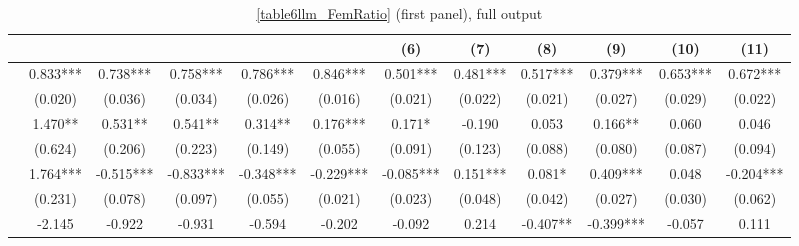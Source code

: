 \begin{table}
    \footnotesize
    \centering
    \begin{threeparttable}
        \caption{\autoref{table6llm_FemRatio} (first panel), full output}
        \label{table6llm_full}
        \begin{tabular}{p{3cm}S@{}S@{}S@{}S@{}S@{}S@{}S@{}S@{}S@{}S@{}S@{}}
            \toprule
            &{}&{}&{}&{}&{}&{(6)}&{(7)}&{(8)}&{(9)}&{(10)}&{(11)}\\
            \midrule
                    &       0.833***&       0.738***&       0.758***&       0.786***&       0.846***&       0.501***&       0.481***&       0.517***&       0.379***&       0.653***&       0.672***\\
                                          &     (0.020)   &     (0.036)   &     (0.034)   &     (0.026)   &     (0.016)   &     (0.021)   &     (0.022)   &     (0.021)   &     (0.027)   &     (0.029)   &     (0.022)   \\
                  &       1.470** &       0.531** &       0.541** &       0.314** &       0.176***&       0.171*  &      -0.190   &       0.053   &       0.166** &       0.060   &       0.046   \\
                                          &     (0.624)   &     (0.206)   &     (0.223)   &     (0.149)   &     (0.055)   &     (0.091)   &     (0.123)   &     (0.088)   &     (0.080)   &     (0.087)   &     (0.094)   \\
                  &       1.764***&      -0.515***&      -0.833***&      -0.348***&      -0.229***&      -0.085***&       0.151***&       0.081*  &       0.409***&       0.048   &      -0.204***\\
                                          &     (0.231)   &     (0.078)   &     (0.097)   &     (0.055)   &     (0.021)   &     (0.023)   &     (0.048)   &     (0.042)   &     (0.027)   &     (0.030)   &     (0.062)   \\
            &      -2.145   &      -0.922   &      -0.931   &      -0.594   &      -0.202   &      -0.092   &       0.214   &      -0.407** &      -0.399***&      -0.057   &       0.111   \\

\end{tabular}
\end{threeparttable}
\end{table}
